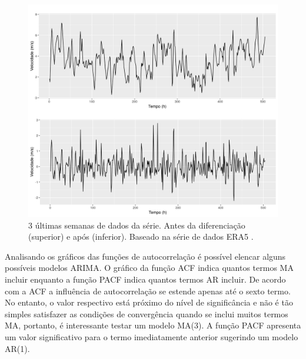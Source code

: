 \documentclass[
	12pt,				%
	openright,			%
	oneside,			%
	a4paper,			%
	english,			%
	french,				%
	spanish,			%
	brazil				%
	]{abntex2}
\begin{document}
\begin{figure}[h]
    \centering
	\includegraphics[width=\textwidth]{last3weeks.png}
	\caption{3 últimas semanas de dados da série. Antes da diferenciação (superior) e após (inferior). Baseado na série de dados ERA5 \cite{era5}.}
\end{figure}
\FloatBarrier 

Analisando os gráficos das funções de autocorrelação é possível elencar alguns possíveis modelos ARIMA. O gráfico da função ACF indica quantos termos MA incluir enquanto a função PACF indica quantos termos AR incluir. De acordo com a ACF a influência de autocorrelação se estende apenas até o sexto termo. No entanto, o valor respectivo está próximo do nível de significância e não é tão simples satisfazer as condições de convergência quando se inclui muitos termos MA, portanto, é interessante testar um modelo MA(3). A função PACF apresenta um valor significativo para o termo imediatamente anterior sugerindo um modelo AR(1). 
\end{document}
